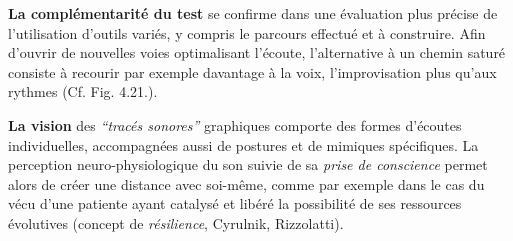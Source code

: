  \textbf{La complémentarité du test} se confirme dans une évaluation plus
 précise de l'utilisation d'outils variés, y compris  le parcours effectué et à
 construire.
 Afin d'ouvrir de nouvelles
 voies optimalisant l'écoute, l'alternative à un chemin saturé
 consiste à recourir par exemple davantage  à la voix, l'improvisation
 plus qu'aux rythmes (Cf. Fig. 4.21.).

 
 \textbf{La vision}
des \textit{``tracés sonores''} graphiques comporte des formes
d'écoutes individuelles, accompagnées aussi de postures et de mimiques spécifiques.
La  perception  
neuro-physiologique du son suivie de sa 
 \textit{prise de conscience }
permet alors de créer une distance avec
soi-même, comme par exemple dans le cas 
du vécu  d'une patiente ayant catalysé et libéré 
la possibilité de ses ressources évolutives (concept de \textit{résilience}, Cyrulnik, Rizzolatti)\autocite[27--63]{van_eersel_cerveau}.












